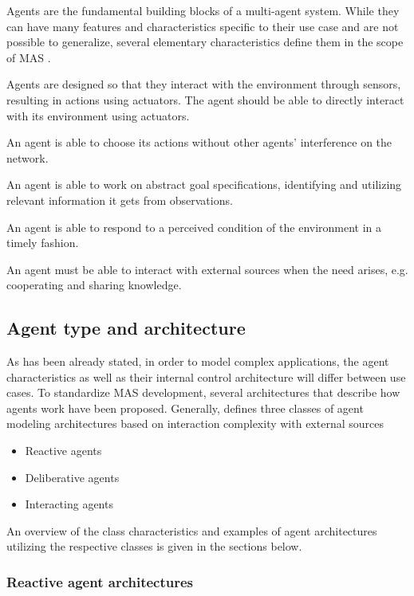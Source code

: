 \documentclass[0main.tex]{subfiles}
\begin{document}
Agents are the fundamental building blocks of a multi-agent system. While they can have many
features and characteristics specific to their use case and are not possible to generalize,
several elementary characteristics define them in the scope of MAS
\cite{ParasumannaGokulan2010}.

Agents are designed so that they interact with the environment through sensors,
resulting in actions using actuators. The agent should be able to directly interact with its
environment using actuators.

An agent is able to choose its actions without other agents' interference on the network.

An agent is able to work on abstract goal specifications, identifying and utilizing relevant information it gets from observations.

An agent is able to respond to a perceived condition of the environment in a timely fashion.

An agent must be able to interact with external sources when the need arises, e.g. cooperating
and sharing knowledge.

\subsection{Agent type and architecture}

As has been already stated, in order to model complex applications, the agent characteristics
as well as their internal control architecture will differ between use cases. To standardize
MAS development, several architectures that describe how agents work have been proposed.
Generally, \cite{Anthony2014} defines three classes of agent modeling architectures based on
interaction complexity with external sources 

\begin{itemize}
    \item Reactive agents
    \item Deliberative agents
    \item Interacting agents
\end{itemize}

An overview of the class characteristics and examples of agent architectures utilizing
the respective classes is given in the sections below.

\subsubsection{Reactive agent architectures}
\end{document}
